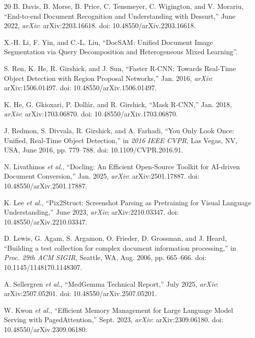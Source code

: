 \documentclass[conference,twocolumn]{IEEEtran}
\begin{document}
\begin{thebibliography}{20}
B. Davis, B. Morse, B. Price, C. Tensmeyer, C. Wigington, and V. Morariu, ``End-to-end Document Recognition and Understanding with Dessurt,'' June 2022, \textit{arXiv}: arXiv:2203.16618. doi: 10.48550/arXiv.2203.16618.

X.-H. Li, F. Yin, and C.-L. Liu, ``DocSAM: Unified Document Image Segmentation via Query Decomposition and Heterogeneous Mixed Learning''.

S. Ren, K. He, R. Girshick, and J. Sun, ``Faster R-CNN: Towards Real-Time Object Detection with Region Proposal Networks,'' Jan. 2016, \textit{arXiv}: arXiv:1506.01497. doi: 10.48550/arXiv.1506.01497.

K. He, G. Gkioxari, P. Dollár, and R. Girshick, ``Mask R-CNN,'' Jan. 2018, \textit{arXiv}: arXiv:1703.06870. doi: 10.48550/arXiv.1703.06870.

J. Redmon, S. Divvala, R. Girshick, and A. Farhadi, ``You Only Look Once: Unified, Real-Time Object Detection,'' in \textit{2016 IEEE CVPR}, Las Vegas, NV, USA, June 2016, pp. 779--788. doi: 10.1109/CVPR.2016.91.

N. Livathinos \textit{et al.}, ``Docling: An Efficient Open-Source Toolkit for AI-driven Document Conversion,'' Jan. 2025, \textit{arXiv}: arXiv:2501.17887. doi: 10.48550/arXiv.2501.17887.

K. Lee \textit{et al.}, ``Pix2Struct: Screenshot Parsing as Pretraining for Visual Language Understanding,'' June 2023, \textit{arXiv}: arXiv:2210.03347. doi: 10.48550/arXiv.2210.03347.

D. Lewis, G. Agam, S. Argamon, O. Frieder, D. Grossman, and J. Heard, ``Building a test collection for complex document information processing,'' in \textit{Proc. 29th ACM SIGIR}, Seattle, WA, Aug. 2006, pp. 665--666. doi: 10.1145/1148170.1148307.

A. Sellergren \textit{et al.}, ``MedGemma Technical Report,'' July 2025, \textit{arXiv}: arXiv:2507.05201. doi: 10.48550/arXiv.2507.05201.

W. Kwon \textit{et al.}, ``Efficient Memory Management for Large Language Model Serving with PagedAttention,'' Sept. 2023, \textit{arXiv}: arXiv:2309.06180. doi: 10.48550/arXiv.2309.06180.

\end{thebibliography}
\end{document}
